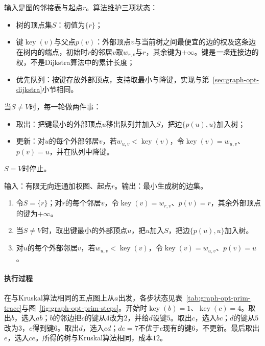 输入是图的邻接表与起点$r$。算法维护三项状态：
\begin{itemize}
  \item 树的顶点集$S$：初值为$\{r\}$；
  \item 键$\operatorname{key}(v)$与父点$p(v)$：外部顶点$v$与当前树之间最便宜的边的权及这条边在树内的端点，初始时$r$的邻居$v$取$w_{r,v}$与$r$，其余键为$+\infty$。键是\emph{一条}连接边的权，不是Dijkstra算法中的累计长度；
  \item 优先队列：按键存放外部顶点，支持取最小与降键，实现与第~\ref{sec:graph-opt-dijkstra}小节相同。
\end{itemize}
当$S\neq V$时，每一轮做两件事：
\begin{itemize}
  \item 取出：把键最小的外部顶点$u$移出队列并加入$S$，把边$\{p(u),u\}$加入树；
  \item 更新：对$u$的每个外部邻居$v$，若$w_{u,v}<\operatorname{key}(v)$，令$\operatorname{key}(v)=w_{u,v}$、$p(v)=u$，并在队列中降键。
\end{itemize}
$S=V$时停止。

\begin{algorithm}[Prim算法]
\label{alg:graph-opt-prim}
输入：有限无向连通加权图、起点$r$。输出：最小生成树的边集。
\begin{enumerate}
  \item 令$S=\{r\}$；对$r$的每个邻居$v$，令$\operatorname{key}(v)=w_{r,v}$、$p(v)=r$，其余外部顶点的键为$+\infty$。
  \item 当$S\neq V$时，取出键最小的外部顶点$u$，把$u$加入$S$，把边$\{p(u),u\}$加入树。
  \item 对$u$的每个外部邻居$v$，若$w_{u,v}<\operatorname{key}(v)$，令$\operatorname{key}(v)=w_{u,v}$、$p(v)=u$。
\end{enumerate}
\end{algorithm}

\paragraph{执行过程}
在与Kruskal算法相同的五点图上从$a$出发，各步状态见表~\ref{tab:graph-opt-prim-trace}与图~\ref{fig:graph-opt-prim-steps}。开始时$\operatorname{key}(b)=1$、$\operatorname{key}(c)=4$。取出$b$，选入$ab$；$b$的邻边把$c$的键从$4$改为$2$，并给$d$设键$5$。取出$c$，选入$bc$；$d$的键从$5$改为$3$，$e$得到键$6$。取出$d$，选入$cd$；$de=7$不优于$e$现有的键$6$，不更新。最后取出$e$，选入$ce$。所得的树与Kruskal算法相同，成本$12$。

